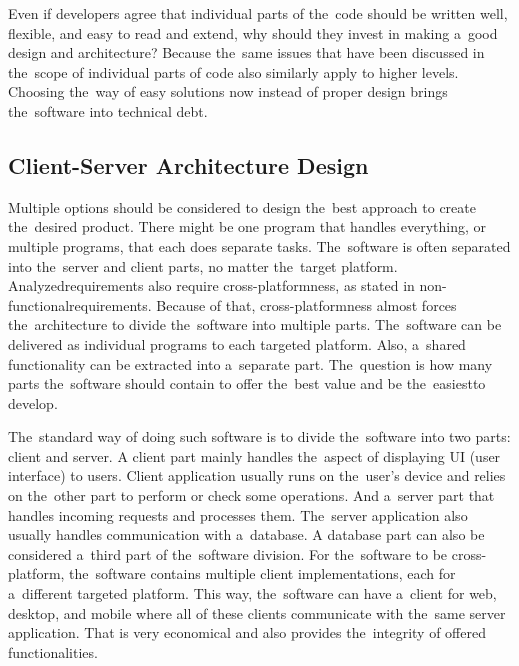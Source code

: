 Even if developers agree that individual parts of the~code should be written well, flexible, and easy to read and extend, why should they invest in making a~good design and architecture?
Because the~same issues that have been discussed in the~scope of individual parts of code also similarly apply to higher levels.
Choosing the~way of easy solutions now instead of proper design brings the~software into technical debt. 

\subsection{Client-Server Architecture Design}

Multiple options should be considered to design the~best approach to create the~desired product.
There might be one program that handles everything, or multiple programs, that each does separate tasks.
The~software is often separated into the~server and client parts, no matter the~target platform.
Analyzed\linebreak{}requirements also require cross-platformness, as stated in non-functional\linebreak{}requirements.
Because of that, cross-platformness almost forces the~architecture to divide the~software into multiple parts.
The~software can be delivered as \mbox{individual} programs to each targeted platform.
Also, a~shared functionality can be extracted into a~separate part.
The~question is how many parts the~software should contain to offer the~best value and be the~easiest\linebreak{}to develop.

The~standard way of doing such software is to divide the~software into two parts: client and server.
A client part mainly handles the~aspect of displaying UI (user interface) to users.
Client application usually runs on the~user's device and relies on the~other part to perform or check some operations.
And a~server part that handles incoming requests and processes them.
The~server application also usually handles communication with a~database.
A database part can also be considered a~third part of the~software division.
For the~software to be cross-platform, the~software contains multiple client implementations, each for a~different targeted platform.
This way, the~software can have a~client for web, desktop, and mobile where all of these clients communicate with the~same server application.
That is very economical and also provides the~integrity of offered functionalities.

